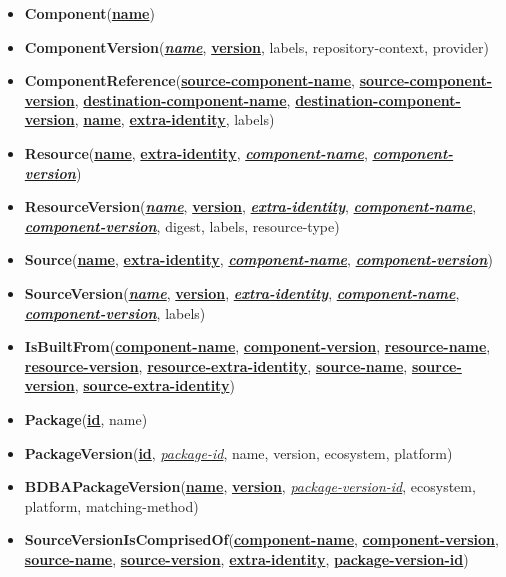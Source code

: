 \begin{itemize}
	\item \textbf{Component}(\textbf{\underline{name}})
	\item \textbf{ComponentVersion}(\textbf{\underline{\textit{name}}}, \textbf{\underline{version}}, labels, repository-context, provider)
	\item \textbf{ComponentReference}(\textbf{\underline{source-component-name}}, \textbf{\underline{source-component-version}}, \textbf{\underline{destination-component-name}}, \textbf{\underline{destination-component-version}}, \textbf{\underline{name}}, \textbf{\underline{extra-identity}}, labels)
	\item \textbf{Resource}(\textbf{\underline{name}}, \textbf{\underline{extra-identity}}, \textbf{\underline{\textit{component-name}}}, \textbf{\underline{\textit{component-version}}})
	\item \textbf{ResourceVersion}(\textbf{\underline{\textit{name}}}, \textbf{\underline{version}}, \textbf{\underline{\textit{extra-identity}}}, \textbf{\underline{\textit{component-name}}}, \textbf{\underline{\textit{component-version}}}, digest, labels, resource-type)
	\item \textbf{Source}(\textbf{\underline{name}}, \textbf{\underline{extra-identity}}, \textbf{\underline{\textit{component-name}}}, \textbf{\underline{\textit{component-version}}})
	\item \textbf{SourceVersion}(\textbf{\underline{\textit{name}}}, \textbf{\underline{version}}, \textbf{\underline{\textit{extra-identity}}}, \textbf{\underline{\textit{component-name}}}, \textbf{\underline{\textit{component-version}}}, labels)
	\item \textbf{IsBuiltFrom}(\textbf{\underline{component-name}}, \textbf{\underline{component-version}}, \textbf{\underline{resource-name}}, \textbf{\underline{resource-version}}, \textbf{\underline{resource-extra-identity}}, \textbf{\underline{source-name}}, \textbf{\underline{source-version}}, \textbf{\underline{source-extra-identity}})
	\item \textbf{Package}(\textbf{\underline{id}}, name)
	\item \textbf{PackageVersion}(\textbf{\underline{id}}, \underline{\textit{package-id}}, name, version, ecosystem, platform)
	\item \textbf{BDBAPackageVersion}(\textbf{\underline{name}}, \textbf{\underline{version}}, \underline{\textit{package-version-id}}, ecosystem, platform, matching-method)
	\item \textbf{SourceVersionIsComprisedOf}(\textbf{\underline{component-name}}, \textbf{\underline{component-version}}, \textbf{\underline{source-name}}, \textbf{\underline{source-version}}, \textbf{\underline{extra-identity}}, \textbf{\underline{package-version-id}})

\end{itemize}
